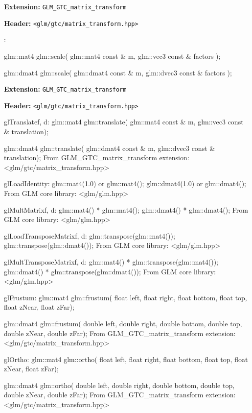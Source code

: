 \documentclass{scrartcl}
\numberwithin{figure}{subsection}
\begin{document}
\textbf{Extension:} \verb|GLM_GTC_matrix_transform|

\textbf{Header:} \verb|<glm/gtc/matrix_transform.hpp>|

:

\begin{cppcode}
glm::mat4 glm::scale(
  glm::mat4 const & m,
  glm::vec3 const & factors
);

glm::dmat4 glm::scale(
  glm::dmat4 const & m, 
  glm::dvec3 const & factors
);
\end{cppcode}

\textbf{Extension:} \verb|GLM_GTC_matrix_transform|

\textbf{Header:} \verb|<glm/gtc/matrix_transform.hpp>|
 
\iffalse
 
glTranslate{f, d}:
glm::mat4 glm::translate(
glm::mat4 const & m,
glm::vec3 const & translation);

glm::dmat4 glm::translate(
glm::dmat4 const & m,
glm::dvec3 const & translation);
From GLM_GTC_matrix_transform extension: <glm/gtc/matrix_transform.hpp>
 
glLoadIdentity:
glm::mat4(1.0) or glm::mat4();
glm::dmat4(1.0) or glm::dmat4();
From GLM core library: <glm/glm.hpp>
 
glMultMatrix{f, d}: 
glm::mat4() * glm::mat4();
glm::dmat4() * glm::dmat4();
From GLM core library: <glm/glm.hpp>
 
glLoadTransposeMatrix{f, d}: 
glm::transpose(glm::mat4());
glm::transpose(glm::dmat4());
From GLM core library: <glm/glm.hpp>
 
glMultTransposeMatrix{f, d}: 
glm::mat4() * glm::transpose(glm::mat4());
glm::dmat4() * glm::transpose(glm::dmat4());
From GLM core library: <glm/glm.hpp>
 
glFrustum: 
glm::mat4 glm::frustum(
float left, float right, 
float bottom, float top, 
float zNear, float zFar);

glm::dmat4 glm::frustum(
double left, double right, 
double bottom, double top, 
double zNear, double zFar);
From GLM_GTC_matrix_transform extension: <glm/gtc/matrix_transform.hpp>
 
glOrtho: 
glm::mat4 glm::ortho(
float left, float right, 
float bottom, float top, 
float zNear, float zFar);

glm::dmat4 glm::ortho(
double left, double right, 
double bottom, double top, 
double zNear, double zFar);
From GLM_GTC_matrix_transform extension: <glm/gtc/matrix_transform.hpp>
\end{document}
